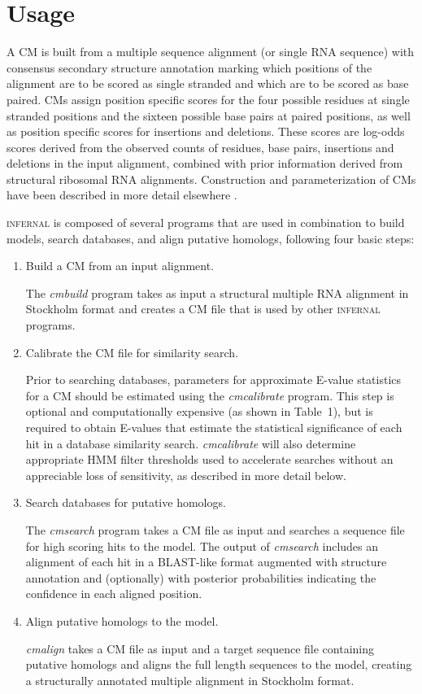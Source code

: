 
\section{Usage} 

A CM is built from a multiple sequence alignment (or single RNA
sequence) with consensus secondary structure annotation marking which
positions of the alignment are to be scored as single stranded and
which are to be scored as base paired. CMs assign position specific
scores for the four possible residues at single stranded positions and
the sixteen possible base pairs at paired positions, as well as
position specific scores for insertions and deletions. These scores
are log-odds scores derived from the observed counts of residues, base
pairs, insertions and deletions in the input alignment, combined with
prior information derived from structural ribosomal RNA
alignments. Construction and parameterization of CMs have been
described in more detail elsewhere
\citep{Eddy94,infguide03,Eddy02b,NawrockiEddy07}.

\textsc{infernal} is composed of several programs that are used in
combination to build models, search databases, and align putative
homologs, following four basic steps:

\begin{enumerate}
\item Build a CM from an input alignment.

The \emph{cmbuild} program takes as input a structural multiple
RNA alignment in Stockholm format \citep{infguide03} and creates a CM
file that is used by other \textsc{infernal} programs.

\item Calibrate the CM file for similarity search.

Prior to searching databases, parameters for approximate E-value
statistics for a CM should be estimated using the \emph{cmcalibrate}
program. This step is optional and computationally expensive (as shown
in Table~1), but is required to obtain E-values that estimate the
statistical significance of each hit in a database similarity
search. \emph{cmcalibrate} will also determine appropriate HMM filter
thresholds used to accelerate searches without an appreciable loss of
sensitivity, as described in more detail below.

\item Search databases for putative homologs.

The \emph{cmsearch} program takes a CM file as input and searches a
sequence file for high scoring hits to the model. The output of
\emph{cmsearch} includes an alignment of each hit in a BLAST-like
format augmented with structure annotation and (optionally) with
posterior probabilities indicating the confidence in each aligned
position.

\item Align putative homologs to the model.

\emph{cmalign} takes a CM file as input and a target sequence file
containing putative homologs and aligns the full length sequences to
the model, creating a structurally annotated multiple alignment in
Stockholm format.

\end{enumerate}

